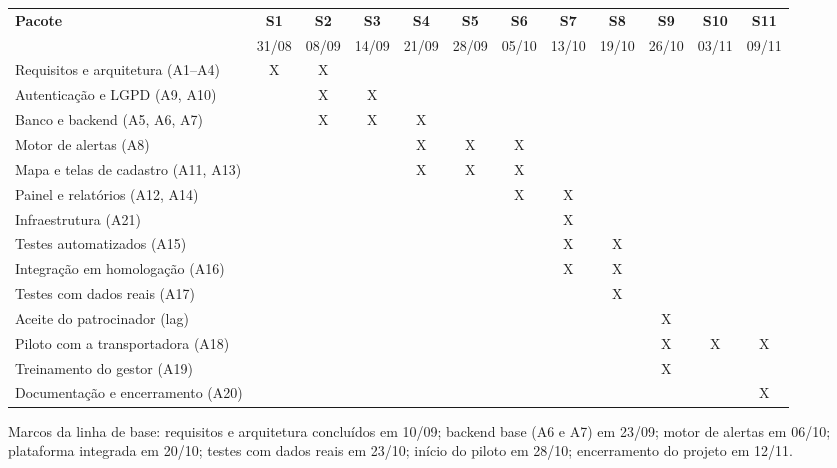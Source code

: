 \documentclass[11pt,a4paper]{article}
\begin{document}
\begin{center}
\scriptsize
\setlength{\tabcolsep}{3pt}
\begin{tabularx}{\textwidth}{>{\raggedright\arraybackslash}p{4.2cm}*{11}{C}}
\toprule
\textbf{Pacote} & \textbf{S1} & \textbf{S2} & \textbf{S3} & \textbf{S4} & \textbf{S5} & \textbf{S6} & \textbf{S7} & \textbf{S8} & \textbf{S9} & \textbf{S10} & \textbf{S11} \\
 & 31/08 & 08/09 & 14/09 & 21/09 & 28/09 & 05/10 & 13/10 & 19/10 & 26/10 & 03/11 & 09/11 \\
\midrule
Requisitos e arquitetura (A1--A4) & X & X &  &  &  &  &  &  &  &  &  \\
Autenticação e LGPD (A9, A10) & & X & X &  &  &  &  &  &  &  &  \\
Banco e backend (A5, A6, A7) & & X & X & X &  &  &  &  &  &  &  \\
Motor de alertas (A8) & & & & X & X & X &  &  &  &  &  \\
Mapa e telas de cadastro (A11, A13) & & & & X & X & X &  &  &  &  &  \\
Painel e relatórios (A12, A14) & & & & & & X & X &  &  &  &  \\
Infraestrutura (A21) & & & & & & & X &  &  &  &  \\
Testes automatizados (A15) & & & & & & & X & X &  &  &  \\
Integração em homologação (A16) & & & & & & & X & X &  &  &  \\
Testes com dados reais (A17) & & & & & & & & X &  &  &  \\
Aceite do patrocinador (lag) & & & & & & & & & X &  &  \\
Piloto com a transportadora (A18) & & & & & & & & & X & X & X \\
Treinamento do gestor (A19) & & & & & & & & & X &  &  \\
Documentação e encerramento (A20) & & & & & & & & &  &  & X \\
\bottomrule
\end{tabularx}
\end{center}

\noindent Marcos da linha de base: requisitos e arquitetura concluídos em 10/09; backend base (A6 e A7) em 23/09; motor de alertas em 06/10; plataforma integrada em 20/10; testes com dados reais em 23/10; início do piloto em 28/10; encerramento do projeto em 12/11.
\end{document}
